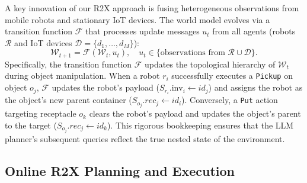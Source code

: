 A key innovation of our R2X approach is fusing heterogeneous observations from mobile robots and stationary IoT devices. The world model evolves via a transition function $\mathcal{F}$ that processes update messages $u_t$ from all agents (robots $\mathcal{R}$ and IoT devices $\mathcal{D}=\{d_1,\dots,d_M\}$):
\begin{equation}
\label{eq:data_fusion}
\mathcal{W}_{t+1} = \mathcal{F}(\mathcal{W}_t, u_t), \quad u_t \in \{\text{observations from } \mathcal{R}\cup\mathcal{D}\}.
\end{equation}
Specifically, the transition function $\mathcal{F}$ updates the topological hierarchy of $\mathcal{W}_t$ during object manipulation. When a robot $r_i$ successfully executes a \texttt{Pickup} on object $o_j$, $\mathcal{F}$ updates the robot's payload ($S_{r_i}.\text{inv}_i \gets id_j$) and assigns the robot as the object's new parent container ($S_{o_j}.rec_j \gets id_i$). Conversely, a \texttt{Put} action targeting receptacle $o_k$ clears the robot's payload and updates the object's parent to the target ($S_{o_j}.rec_j \gets id_k$). This rigorous bookkeeping ensures that the LLM planner's subsequent queries reflect the true nested state of the environment.



\subsection{Online R2X Planning and Execution}
\label{subsec:planning_execution}

